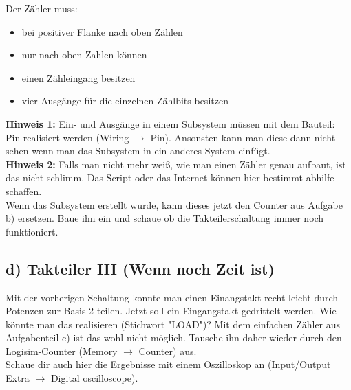 \documentclass[a4paper]{scrartcl}
\begin{document}
Der Zähler muss:
\begin{itemize}
	\item bei positiver Flanke nach oben Zählen
	\item nur nach oben Zahlen können
	\item einen Zähleingang besitzen
	\item vier Ausgänge für die einzelnen Zählbits besitzen
\end{itemize}

\textbf{Hinweis 1:} Ein- und Ausgänge in einem Subsystem müssen mit dem Bauteil: Pin realisiert werden (Wiring $\rightarrow$ Pin). Ansonsten kann man diese dann nicht sehen wenn man das Subsystem in ein anderes System einfügt. \\
\textbf{Hinweis 2:} Falls man nicht mehr weiß, wie man einen Zähler genau aufbaut, ist das nicht schlimm. Das Script oder das Internet können hier bestimmt abhilfe schaffen.\\


Wenn das Subsystem erstellt wurde, kann dieses jetzt den Counter aus Aufgabe b) ersetzen. Baue ihn ein und schaue ob die Takteilerschaltung immer noch funktioniert.
\newpage

\subsection*{d) Takteiler III (Wenn noch Zeit ist)}
Mit der vorherigen Schaltung konnte man einen Einangstakt recht leicht durch Potenzen zur Basis 2 teilen. 
Jetzt soll ein Eingangstakt gedrittelt werden. Wie könnte man das realisieren (Stichwort "LOAD")? Mit dem einfachen Zähler aus Aufgabenteil c) ist das wohl nicht möglich. Tausche ihn daher wieder durch den Logisim-Counter (Memory $\rightarrow$ Counter) aus.\\
Schaue dir auch hier die Ergebnisse mit einem Oszilloskop an (Input/Output Extra $\rightarrow$ Digital oscilloscope).
\end{document}
